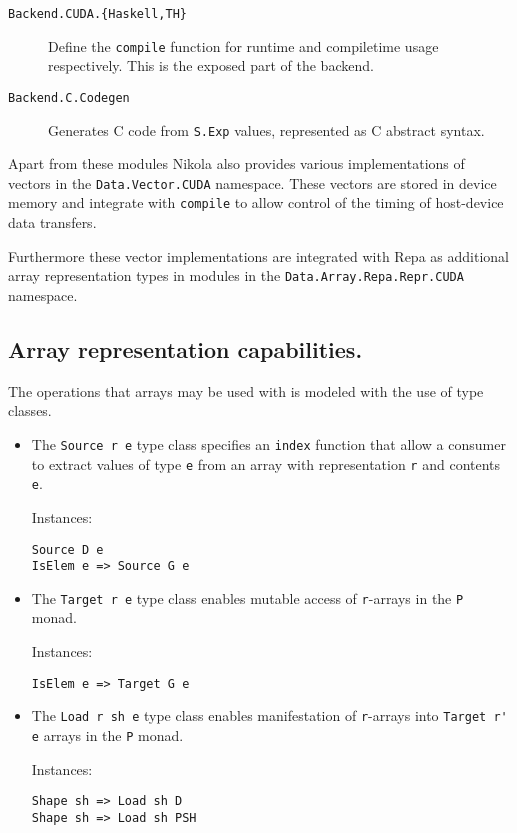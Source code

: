 \begin{description}

  \item[\texttt{Backend.CUDA.\{Haskell,TH\}}]
    Define the \lstinline{compile} function for runtime and compiletime usage
    respectively. This is the exposed part of the backend.

  \item[\texttt{Backend.C.Codegen}] Generates C code from
    \lstinline{S.Exp} values, represented as C abstract syntax.

\end{description}

Apart from these modules Nikola also provides various implementations of
vectors in the \lstinline{Data.Vector.CUDA} namespace. These vectors are
stored in device memory and integrate with \lstinline{compile} to allow
control of the timing of host-device data transfers.

Furthermore these vector implementations are integrated with Repa as additional
array representation types in modules in the \lstinline{Data.Array.Repa.Repr.CUDA}
namespace.

\subsection{Array representation capabilities.}
The operations that arrays may be used with is modeled with the use of type
classes.

\begin{itemize}
  \item The \lstinline{Source r e} type class specifies an \lstinline{index}
    function that allow a consumer to extract values of type \lstinline{e} from an
    array with representation \lstinline{r} and contents \lstinline{e}.

    Instances:
\begin{lstlisting}
Source D e
IsElem e => Source G e
\end{lstlisting}
  \item The \lstinline{Target r e} type class enables mutable access of
    \lstinline{r}-arrays in the \lstinline{P} monad.

    Instances:
\begin{lstlisting}
IsElem e => Target G e
\end{lstlisting}
  \item The \lstinline{Load r sh e} type class enables manifestation of
    \lstinline{r}-arrays into \lstinline{Target r' e} arrays in the \lstinline{P} monad.

    Instances:
\begin{lstlisting}
Shape sh => Load sh D 
Shape sh => Load sh PSH
\end{lstlisting}

\end{itemize}

